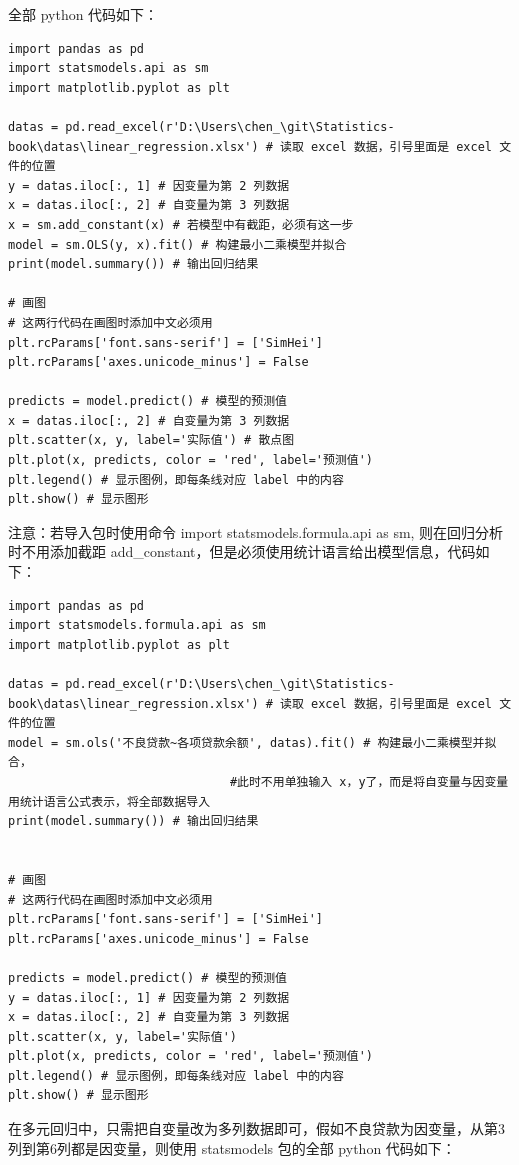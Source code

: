 全部 python 代码如下：

\begin{lstlisting}[Language=Python]
import pandas as pd
import statsmodels.api as sm
import matplotlib.pyplot as plt

datas = pd.read_excel(r'D:\Users\chen_\git\Statistics-book\datas\linear_regression.xlsx') # 读取 excel 数据，引号里面是 excel 文件的位置
y = datas.iloc[:, 1] # 因变量为第 2 列数据
x = datas.iloc[:, 2] # 自变量为第 3 列数据
x = sm.add_constant(x) # 若模型中有截距，必须有这一步
model = sm.OLS(y, x).fit() # 构建最小二乘模型并拟合
print(model.summary()) # 输出回归结果

# 画图
# 这两行代码在画图时添加中文必须用
plt.rcParams['font.sans-serif'] = ['SimHei']
plt.rcParams['axes.unicode_minus'] = False

predicts = model.predict() # 模型的预测值
x = datas.iloc[:, 2] # 自变量为第 3 列数据
plt.scatter(x, y, label='实际值') # 散点图
plt.plot(x, predicts, color = 'red', label='预测值')
plt.legend() # 显示图例，即每条线对应 label 中的内容
plt.show() # 显示图形
\end{lstlisting}

注意：若导入包时使用命令 import statsmodels.formula.api as sm, 则在回归分析时不用添加截距 add\_constant，但是必须使用统计语言给出模型信息，代码如下：

\begin{lstlisting}[Language=Python]
import pandas as pd
import statsmodels.formula.api as sm
import matplotlib.pyplot as plt

datas = pd.read_excel(r'D:\Users\chen_\git\Statistics-book\datas\linear_regression.xlsx') # 读取 excel 数据，引号里面是 excel 文件的位置
model = sm.ols('不良贷款~各项贷款余额', datas).fit() # 构建最小二乘模型并拟合，
                               #此时不用单独输入 x，y了，而是将自变量与因变量用统计语言公式表示，将全部数据导入
print(model.summary()) # 输出回归结果


# 画图
# 这两行代码在画图时添加中文必须用
plt.rcParams['font.sans-serif'] = ['SimHei']
plt.rcParams['axes.unicode_minus'] = False

predicts = model.predict() # 模型的预测值
y = datas.iloc[:, 1] # 因变量为第 2 列数据
x = datas.iloc[:, 2] # 自变量为第 3 列数据
plt.scatter(x, y, label='实际值')
plt.plot(x, predicts, color = 'red', label='预测值')
plt.legend() # 显示图例，即每条线对应 label 中的内容
plt.show() # 显示图形
\end{lstlisting}

在多元回归中，只需把自变量改为多列数据即可，假如不良贷款为因变量，从第3列到第6列都是因变量，则使用 statsmodels 包的全部 python 代码如下：

